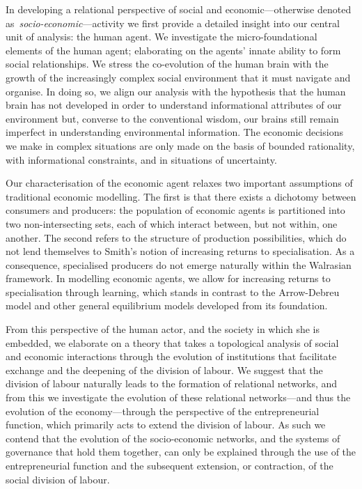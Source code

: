 \medskip\noindent In developing a relational perspective of social and economic---otherwise denoted as~\emph{socio-economic}---activity we first provide a detailed insight into our central unit of analysis: the human agent. We investigate the micro-foundational elements of the human agent; elaborating on the agents' innate ability to form social relationships. We stress the co-evolution of the human brain with the growth of the increasingly complex social environment that it must navigate and organise. In doing so, we align our analysis with the hypothesis that the human brain has not developed in order to understand informational attributes of our environment but, converse to the conventional wisdom, our brains still remain imperfect in understanding environmental information. The economic decisions we make in complex situations are only made on the basis of bounded rationality, with informational constraints, and in situations of uncertainty.

Our characterisation of the economic agent relaxes two important assumptions of traditional economic modelling. The first is that there exists a dichotomy between consumers and producers: the population of economic agents is partitioned into two non-intersecting sets, each of which interact between, but not within, one another. The second refers to the structure of production possibilities, which do not lend themselves to Smith's notion of increasing returns to specialisation. As a consequence, specialised producers do not emerge naturally within the Walrasian framework. In modelling economic agents, we allow for increasing returns to specialisation through learning, which stands in contrast to the Arrow-Debreu model and other general equilibrium models developed from its foundation.

From this perspective of the human actor, and the society in which she is embedded, we elaborate on a theory that takes a topological analysis of social and economic interactions through the evolution of institutions that facilitate exchange and the deepening of the division of labour. We suggest that the division of labour naturally leads to the formation of relational networks, and from this we investigate the evolution of these relational networks---and thus the evolution of the economy---through the perspective of the entrepreneurial function, which primarily acts to extend the division of labour. As such we contend that the evolution of the socio-economic networks, and the systems of governance that hold them together, can only be explained through the use of the entrepreneurial function and the subsequent extension, or contraction, of the social division of labour.

